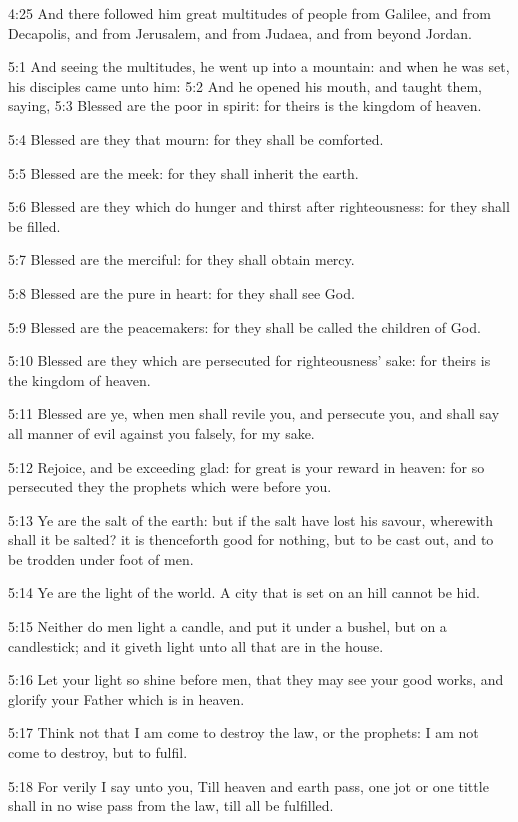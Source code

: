 4:25 And there followed him great multitudes of people from Galilee,
and from Decapolis, and from Jerusalem, and from Judaea, and from
beyond Jordan.

5:1 And seeing the multitudes, he went up into a mountain: and when he
was set, his disciples came unto him: 5:2 And he opened his mouth, and
taught them, saying, 5:3 Blessed are the poor in spirit: for theirs is
the kingdom of heaven.

5:4 Blessed are they that mourn: for they shall be comforted.

5:5 Blessed are the meek: for they shall inherit the earth.

5:6 Blessed are they which do hunger and thirst after righteousness:
for they shall be filled.

5:7 Blessed are the merciful: for they shall obtain mercy.

5:8 Blessed are the pure in heart: for they shall see God.

5:9 Blessed are the peacemakers: for they shall be called the children
of God.

5:10 Blessed are they which are persecuted for righteousness' sake:
for theirs is the kingdom of heaven.

5:11 Blessed are ye, when men shall revile you, and persecute you, and
shall say all manner of evil against you falsely, for my sake.

5:12 Rejoice, and be exceeding glad: for great is your reward in
heaven: for so persecuted they the prophets which were before you.

5:13 Ye are the salt of the earth: but if the salt have lost his
savour, wherewith shall it be salted? it is thenceforth good for
nothing, but to be cast out, and to be trodden under foot of men.

5:14 Ye are the light of the world. A city that is set on an hill
cannot be hid.

5:15 Neither do men light a candle, and put it under a bushel, but on
a candlestick; and it giveth light unto all that are in the house.

5:16 Let your light so shine before men, that they may see your good
works, and glorify your Father which is in heaven.

5:17 Think not that I am come to destroy the law, or the prophets: I
am not come to destroy, but to fulfil.

5:18 For verily I say unto you, Till heaven and earth pass, one jot or
one tittle shall in no wise pass from the law, till all be fulfilled.


